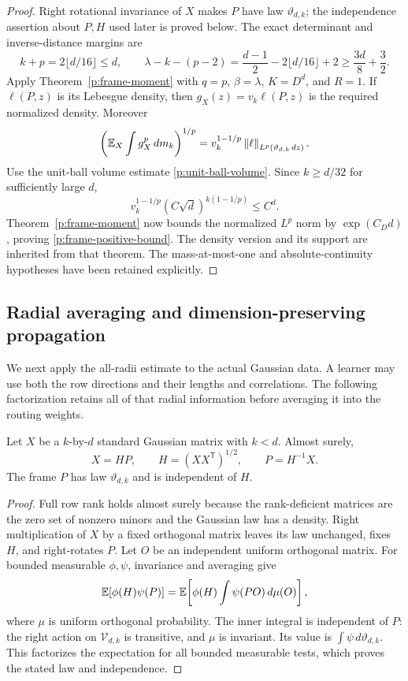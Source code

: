 \begin{proof}
Right rotational invariance of \(X\) makes \(P\) have law
\(\vartheta_{d,k}\); the independence assertion about \(P,H\) used later
is proved below. The exact determinant and inverse-distance margins are
\[
 k+p=2\lfloor d/16\rfloor\le d,\qquad
 \lambda-k-(p-2)
 =\frac{d-1}{2}-2\lfloor d/16\rfloor+2
 \ge\frac{3d}{8}+\frac32.
\]
Apply Theorem~\ref{p:frame-moment} with \(q=p\), \(\beta=\lambda\),
\(K=D^d\), and \(R=1\). If \(\ell(P,z)\) is its Lebesgue density,
then \(g_X(z)=v_k\ell(P,z)\) is the required normalized density. Moreover
\[
 \left(\mathbb E_X\int g_X^p\,dm_k\right)^{1/p}
 =v_k^{1-1/p}\left\lVert \ell\right\rVert_{L^p(\vartheta_{d,k}\,dz)}.
\]
Use the unit-ball volume estimate \eqref{p:unit-ball-volume}.
Since \(k\ge d/32\) for sufficiently large \(d\),
\[
 v_k^{1-1/p}(C\sqrt d)^{k(1-1/p)}\le C^d.
\]
Theorem~\ref{p:frame-moment} now bounds the normalized \(L^p\) norm by
\(\exp(C_Dd)\), proving \eqref{p:frame-positive-bound}. The density
version and its support are inherited from that theorem. The mass-at-most-one
and absolute-continuity hypotheses have been retained explicitly.
\end{proof}

\subsection{Radial averaging and dimension-preserving propagation}

We next apply the all-radii estimate to the actual Gaussian data. A learner
may use both the row directions and their lengths and correlations. The
following factorization retains all of that radial information before
averaging it into the routing weights.

\begin{lemma}\label{p:radial-factor}
Let \(X\) be a \(k\)-by-\(d\) standard Gaussian matrix with \(k<d\).
Almost surely,
\[
 X=HP,\qquad H=(XX^{\mathsf T})^{1/2},\qquad P=H^{-1}X.
\]
The frame \(P\) has law \(\vartheta_{d,k}\) and is independent of \(H\).
\end{lemma}

\begin{proof}
Full row rank holds almost surely because the rank-deficient matrices are
the zero set of nonzero minors and the Gaussian law has a density. Right
multiplication of \(X\) by a fixed orthogonal matrix leaves its law
unchanged, fixes \(H\), and right-rotates \(P\). Let \(O\) be an independent
uniform orthogonal matrix. For bounded measurable \(\phi,\psi\), invariance
and averaging give
\[
 \mathbb E[\phi(H)\psi(P)]
 =\mathbb E\!\left[\phi(H)\int\psi(PO)\,d\mu(O)\right],
\]
where \(\mu\) is uniform orthogonal probability. The inner integral is
independent of \(P\): the right action on \(\mathcal V_{d,k}\) is
transitive, and \(\mu\) is invariant. Its value is
\(\int\psi\,d\vartheta_{d,k}\). This factorizes the expectation for all
bounded measurable tests, which proves the stated law and independence.
\end{proof}

